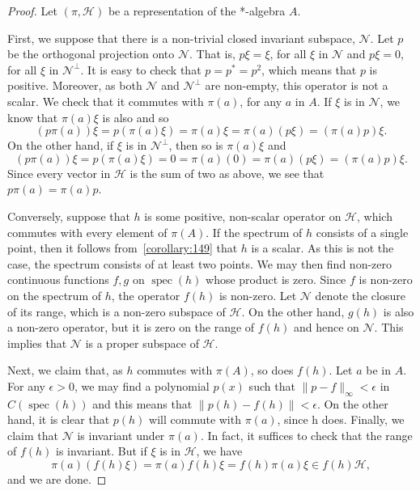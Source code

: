 \documentclass{book}
\begin{document}
\begin{proof}
  Let \((\pi,\mathcal{H})\) be a representation of the *-algebra \(A\).\par
  First, we suppose that there is a non-trivial closed invariant subspace, \(\mathcal{N}\).
  Let \(p\) be the orthogonal projection onto \(\mathcal{N}\). That is, \(p\xi = \xi\), for all \(\xi\) in \(\mathcal{N}\)
  and \(p\xi = 0\), for all \(\xi\) in \(\mathcal{N}^\bot\). It is easy to check that \(p = p^* = p^2\), which
  means that \(p\) is positive. Moreover, as both \(\mathcal{N}\) and \(\mathcal{N}^\bot\) are non-empty, this
  operator is not a scalar. We check that it commutes with \(\pi(a)\), for any \(a\) in
  \(A\). If \(\xi\) is in \(\mathcal{N}\), we know that \(\pi(a)\xi\) is also and so
  \[
  (p\pi(a))\xi = p(\pi(a)\xi) = \pi(a)\xi = \pi(a)(p\xi) = (\pi(a)p)\xi.
  \]
  On the other hand, if \(\xi\) is in \(\mathcal{N}^\bot\), then so is \(\pi(a)\xi\) and
  \[
  (p\pi(a))\xi = p(\pi(a)\xi) = 0 = \pi(a)(0) = \pi(a)(p\xi) = (\pi(a)p)\xi.
  \]
  Since every vector in \(\mathcal{H}\) is the sum of two as above, we see that \(p\pi(a) = \pi(a)p\).\par
  Conversely, suppose that \(h\) is some positive, non-scalar operator on \(\mathcal{H}\),
  which commutes with every element of \(\pi(A)\). If the spectrum of \(h\) consists
  of a single point, then it follows from~\ref{corollary:149} that \(h\) is a scalar. As this is not
  the case, the spectrum consists of at least two points. We may then find
  non-zero continuous functions \(f,g\) on \(\operatorname{spec}(h)\) whose product is zero. Since
  \(f\) is non-zero on the spectrum of \(h\), the operator \(f(h)\) is non-zero. Let \(\mathcal{N}\)
  denote the closure of its range, which is a non-zero subspace of \(\mathcal{H}\). On the
  other hand, \(g(h)\) is also a non-zero operator, but it is zero on the range of
  \(f(h)\) and hence on \(\mathcal{N}\). This implies that \(\mathcal{N}\) is a proper subspace of \(\mathcal{H}\).\par
  Next, we claim that, as \(h\) commutes with \(\pi(A)\), so does \(f(h)\). Let \(a\) be
  in \(A\). For any \(\epsilon> 0\), we may find a polynomial \(p(x)\) such that \(\|p-f\|_\infty <\epsilon\) 
  in \(C(\operatorname{spec}(h))\) and this means that \(\|p(h) - f(h)\| < \epsilon\). On the other hand,
  it is clear that \(p(h)\) will commute with \(\pi(a)\), since h does. Finally, we claim
  that \(\mathcal{N}\) is invariant under \(\pi(a)\). In fact, it suffices to check that the range of
  \(f(h)\) is invariant. But if \(\xi\) is in \(\mathcal{H}\), we have
  \[\pi(a)(f(h)\xi) = \pi(a)f(h)\xi = f(h)\pi(a)\xi \in f(h)\mathcal{H},\]
  and we are done.
\end{proof}
\end{document}
